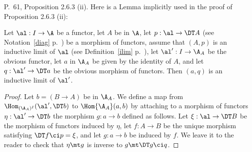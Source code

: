 \documentclass[12pt]{article}
\theoremstyle{remark}
\theoremstyle{definition}
\begin{document}

\begin{s} 
P.~61, Proposition 2.6.3 (ii). Here is a Lemma implicitly used in the proof of Proposition 2.6.3 (ii): 

\begin{lem} 
Let $\al:I\to\A$ be a functor, let $A$ be in $\A$, let $p:\al\to\DT A$ (see Notation~\ref{diag} p.~) be a morphism of functors, assume that $(A,p)$ is an inductive limit of $\al$ (see Definition~\ref{ilim} p.~), let $\al':I\to\A_A$ be the obvious functor, let $a$ in $\A_A$ be given by the identity of $A$, and let $q:\al'\to\DT a$ be the obvious morphism of functors. Then $(a,q)$ is an inductive limit of $\al'$. 
\end{lem} 

\begin{proof}
Let $b=(B\to A)$ be in $\A_A$. We define a map from $\Hom_{(\A_A)^I}(\al',\DT b)$ to $\Hom{\A_A}(a,b)$ by attaching to a morphism of functors $\eta:\al'\to\DT b$ the morphism $g:a\to b$ defined as follows. Let $\xi:\al\to\DT B$ be the morphism of functors induced by $\eta$, let $f:A\to B$ be the unique morphism satisfying $\DT f\ci p=\xi$, and let $g:a\to b$ be induced by $f$. We leave it to the reader to check that $\eta\mt g$ is inverse to $g\mt\DT g\ci q$.
\end{proof}
\end{s}

%
\end{document}
